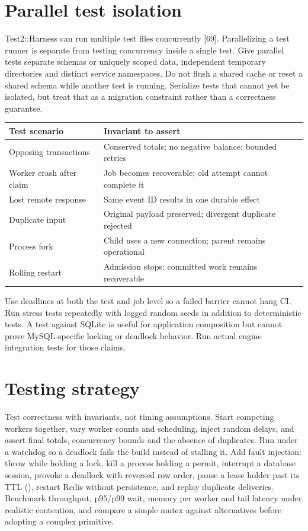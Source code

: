 \section{Parallel test isolation}
Test2::Harness can run multiple test files concurrently [69].
Parallelizing a test runner is separate from testing concurrency inside a
single test. Give parallel tests separate schemas or uniquely scoped data,
independent temporary directories and distinct service namespaces. Do not
flush a shared cache or reset a shared schema while another test is running.
Serialize tests that cannot yet be isolated, but treat that as a migration
constraint rather than a correctness guarantee.

\begin{longtable}{L{.31\linewidth}L{.61\linewidth}}
\toprule Test scenario & Invariant to assert \\ \midrule\endhead
Opposing transactions & Conserved totals; no negative balance; bounded retries \\
Worker crash after claim & Job becomes recoverable; old attempt cannot complete it \\
Lost remote response & Same event ID results in one durable effect \\
Duplicate input & Original payload preserved; divergent duplicate rejected \\
Process fork & Child uses a new connection; parent remains operational \\
Rolling restart & Admission stops; committed work remains recoverable \\
\bottomrule
\end{longtable}
Use deadlines at both the test and job level so a failed barrier cannot
hang CI. Run stress tests repeatedly with logged random seeds in addition
to deterministic tests. A test against SQLite is useful for application
composition but cannot prove MySQL-specific locking or deadlock behavior.
Run actual engine integration tests for those claims.

\section{Testing strategy}
Test correctness with invariants, not timing assumptions. Start competing workers together, vary worker counts and scheduling, inject random delays, and assert final totals, concurrency bounds and the absence of duplicates. Run under a watchdog so a deadlock fails the build instead of stalling it. Add fault injection: throw while holding a lock, kill a process holding a permit, interrupt a database session, provoke a deadlock with reversed row order, pause a lease holder past its TTL (), restart Redis without persistence, and replay duplicate deliveries. Benchmark throughput, p95/p99 wait, memory per worker and tail latency under realistic contention, and compare a simple mutex against alternatives before adopting a complex primitive.


